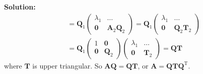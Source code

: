 \documentclass[14pt]{article}
\theoremstyle{definition}
\newenvironment{solution}
{\color{C2}\begin{framed}\begingroup\textbf{Solution:} }
  {\endgroup\end{framed}}
\theoremstyle{remark}
\begin{document}
\begin{solution}
$$\begin{aligned}
                                           & =\boldsymbol{Q}_1\left(\begin{array}{cc}
                                                                            \lambda_1  & \ldots                            \\
                                                                            \mathbf{0} & \boldsymbol{A}_2 \boldsymbol{Q}_2
                                                                        \end{array}\right)=\boldsymbol{Q}_1\left(\begin{array}{cc}
                                                                                                                     \lambda_1  & \ldots                            \\
                                                                                                                     \mathbf{0} & \boldsymbol{Q}_2 \boldsymbol{T}_2
                                                                                                                 \end{array}\right)                      \\
                                           & =\boldsymbol{Q}_1\left(\begin{array}{cc}
                                                                            1          & \mathbf{0}       \\
                                                                            \mathbf{0} & \boldsymbol{Q}_2
                                                                        \end{array}\right)\left(\begin{array}{cc}
                                                                                                    \lambda_1  & \ldots           \\
                                                                                                    \mathbf{0} & \boldsymbol{T}_2
                                                                                                \end{array}\right)=\boldsymbol{Q} \boldsymbol{T}
        \end{aligned}
    $$
    where $\boldsymbol{T}$ is upper triangular. So $\boldsymbol{A} \boldsymbol{Q}=\boldsymbol{Q} \boldsymbol{T}$, or $\boldsymbol{A}=\boldsymbol{Q} \boldsymbol{T} \boldsymbol{Q}^{\mathrm{T}}$.
\end{solution}
\end{document}
